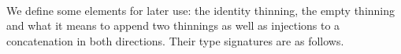 \begin{code}%
\>[0]\AgdaSpace{}%
\AgdaSpace{}%
\AgdaSymbol{:}\AgdaSpace{}%
\AgdaSpace{}%
\AgdaSpace{}%
\AgdaSpace{}%
\AgdaSpace{}%
\AgdaSpace{}%
\<%
\\
\>[0][@{}l@{\AgdaIndent{0}}]%
\>[2]%
\>[6]\AgdaSymbol{:}\AgdaSpace{}%
\AgdaSpace{}%
\AgdaSpace{}%
\<%
\\
%
\>[2]%
\>[6]\AgdaSymbol{:}\AgdaSpace{}%
\AgdaSymbol{(}\AgdaSpace{}%
\AgdaSymbol{:}\AgdaSpace{}%
\AgdaSpace{}%
\AgdaSpace{}%
\AgdaSymbol{)}\AgdaSpace{}%
\AgdaSpace{}%
\AgdaSpace{}%
\AgdaSpace{}%
\AgdaSpace{}%
\<%
\\
%
\>[2]%
\>[6]\AgdaSymbol{:}\AgdaSpace{}%
\AgdaSymbol{(}\AgdaSpace{}%
\AgdaSymbol{:}\AgdaSpace{}%
\AgdaSpace{}%
\AgdaSpace{}%
\AgdaSymbol{)}\AgdaSpace{}%
\AgdaSpace{}%
\AgdaSpace{}%
\AgdaSpace{}%
\AgdaSpace{}%
\AgdaSpace{}%
\<%
\end{code}

We define some elements for later use: the identity thinning, the empty
thinning and what it means to append two thinnings as well as injections
to a concatenation in both directions. Their type signatures are as follows.

